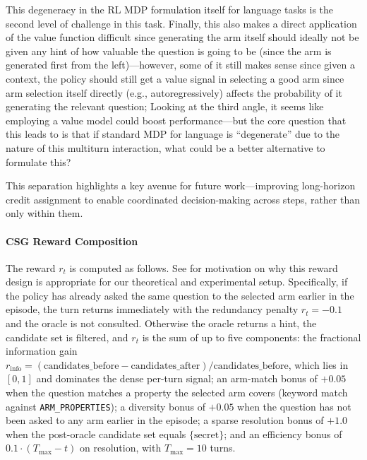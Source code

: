 \documentclass[11pt]{article}
\theoremstyle{plain}
\theoremstyle{definition}
\theoremstyle{remark}
\begin{document}
This degeneracy in the RL MDP formulation itself for language tasks is the second level of challenge in this task. Finally, this also makes a direct application of the value function difficult since generating the arm itself should ideally not be given any hint of how valuable the question is going to be (since the arm is generated first from the left)—however, some of it still makes sense since given a context, the policy should still get a value signal in selecting a good arm since arm selection itself directly (e.g., autoregressively) affects the probability of it generating the relevant question; Looking at the third angle, it seems like employing a value model could boost performance—but the core question that this leads to is that if standard MDP for language is “degenerate” due to the nature of this multiturn interaction, what could be a better alternative to formulate this? 



This separation highlights a key avenue for future work—improving long-horizon credit assignment to enable coordinated decision-making across steps, rather than only within them.

\fi


\paragraph{CSG Reward Composition} The reward  $r_t$ is computed as follows. See  for motivation on why this reward design is appropriate for our theoretical and experimental setup.  Specifically, if the policy has already asked the same question to the selected arm earlier in the episode, the turn returns immediately with the redundancy penalty $r_t = -0.1$ and the oracle is not consulted. Otherwise the oracle returns a hint, the candidate set is filtered, and $r_t$ is the sum of up to five components: the fractional information gain $r_{\text{info}} = (\text{candidates\_before} - \text{candidates\_after}) / \text{candidates\_before}$, which lies in $[0,1]$ and dominates the dense per-turn signal; an arm-match bonus of $+0.05$ when the question matches a property the selected arm covers (keyword match against \texttt{ARM\_PROPERTIES}); a diversity bonus of $+0.05$ when the question has not been asked to any arm earlier in the episode; a sparse resolution bonus of $+1.0$ when the post-oracle candidate set equals $\{\text{secret}\}$; and an efficiency bonus of $0.1 \cdot (T_{\max} - t)$ on resolution, with $T_{\max} = 10$ turns. 
\end{document}

